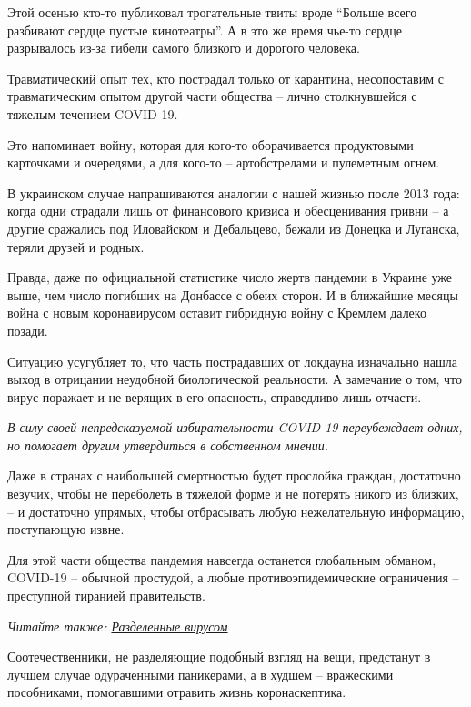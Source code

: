 Этой осенью кто-то публиковал  трогательные твиты вроде \enquote{Больше всего разбивают
сердце пустые кинотеатры}. А в это же время чье-то сердце разрывалось из-за
гибели самого близкого и дорогого человека.

Травматический опыт тех, кто пострадал только от карантина, несопоставим с
травматическим опытом другой части общества – лично столкнувшейся с тяжелым
течением COVID-19.

Это напоминает войну, которая для кого-то оборачивается продуктовыми карточками
и очередями, а для кого-то – артобстрелами и пулеметным огнем.

В украинском случае напрашиваются аналогии с нашей жизнью после 2013 года:
когда одни страдали лишь от финансового кризиса и обесценивания гривни – а
другие сражались под Иловайском и Дебальцево, бежали из Донецка и Луганска,
теряли друзей и родных.

Правда, даже по официальной статистике число жертв пандемии  в Украине уже
выше, чем число погибших на Донбассе с обеих сторон. И в ближайшие месяцы война
с новым коронавирусом оставит гибридную войну с Кремлем далеко позади.

Ситуацию усугубляет то, что часть пострадавших от локдауна изначально нашла
выход в отрицании неудобной биологической реальности. А замечание о том, что
вирус  поражает и не верящих в его опасность, справедливо лишь отчасти.

\begin{leftbar}
	\begingroup
		\em
			В силу своей непредсказуемой избирательности COVID-19 переубеждает одних,
				но помогает другим утвердиться в собственном мнении.
	\endgroup
\end{leftbar}

Даже в странах  с наибольшей смертностью будет прослойка граждан, достаточно
везучих, чтобы не переболеть в тяжелой форме и не потерять никого из близких, –
и достаточно упрямых, чтобы отбрасывать любую нежелательную  информацию,
поступающую извне.  

Для этой части общества пандемия навсегда останется глобальным обманом,
COVID-19 – обычной  простудой, а любые противоэпидемические ограничения –
преступной тиранией правительств.

\begin{leftbar}
	\begingroup
		\em
				Читайте также: \href{https://www.pravda.com.ua/rus/articles/2020/09/12/7266157/}{Разделенные вирусом}
	\endgroup
\end{leftbar}

Соотечественники, не разделяющие подобный взгляд на вещи, предстанут в лучшем
случае одураченными паникерами, а в худшем – вражескими пособниками,
помогавшими отравить жизнь коронаскептика.

